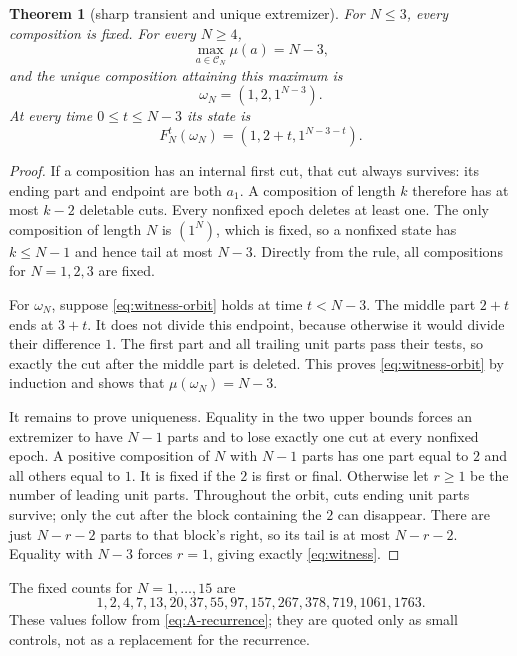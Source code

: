 \documentclass[a4paper,10pt]{amsart}
\newtheorem{theorem}{Theorem}[section]
\theoremstyle{remark}
\newcommand{\Comp}{\mathcal C}
\begin{document}
\begin{theorem}[sharp transient and unique extremizer]\label{thm:clock}
For $N\leq3$, every composition is fixed.  For every $N\geq4$,
\begin{equation}\label{eq:max-tail}
 \max_{a\in\Comp_N}\mu(a)=N-3,
\end{equation}
and the unique composition attaining this maximum is
\begin{equation}\label{eq:witness}
 \omega_N=(1,2,1^{N-3}).
\end{equation}
At every time $0\leq t\leq N-3$ its state is
\begin{equation}\label{eq:witness-orbit}
 F_N^t(\omega_N)=(1,2+t,1^{N-3-t}).
\end{equation}
\end{theorem}

\begin{proof}
If a composition has an internal first cut, that cut always survives: its
ending part and endpoint are both $a_1$.  A composition of length $k$
therefore has at most $k-2$ deletable cuts.  Every nonfixed epoch deletes at
least one.  The only composition of length $N$ is $(1^N)$, which is fixed, so
a nonfixed state has $k\leq N-1$ and hence tail at most $N-3$.  Directly from
the rule, all compositions for $N=1,2,3$ are fixed.

For $\omega_N$, suppose \eqref{eq:witness-orbit} holds at time $t<N-3$.
The middle part $2+t$ ends at $3+t$.  It does not divide this endpoint,
because otherwise it would divide their difference $1$.  The first part and
all trailing unit parts pass their tests, so exactly the cut after the middle
part is deleted.  This proves \eqref{eq:witness-orbit} by induction and shows
that $\mu(\omega_N)=N-3$.

It remains to prove uniqueness.  Equality in the two upper bounds forces an
extremizer to have $N-1$ parts and to lose exactly one cut at every nonfixed
epoch.  A positive composition of $N$ with $N-1$ parts has one part equal to
$2$ and all others equal to $1$.  It is fixed if the $2$ is first or final.
Otherwise let $r\geq1$ be the number of leading unit parts.  Throughout the
orbit, cuts ending unit parts survive; only the cut after the block containing
the $2$ can disappear.  There are just $N-r-2$ parts to that block's right,
so its tail is at most $N-r-2$.  Equality with $N-3$ forces $r=1$, giving
exactly \eqref{eq:witness}.
\end{proof}

The fixed counts for $N=1,\ldots,15$ are
\begin{equation*}
1,2,4,7,13,20,37,55,97,157,267,378,719,1061,1763.
\end{equation*}
These values follow from \eqref{eq:A-recurrence}; they are quoted only as
small controls, not as a replacement for the recurrence.
\end{document}
